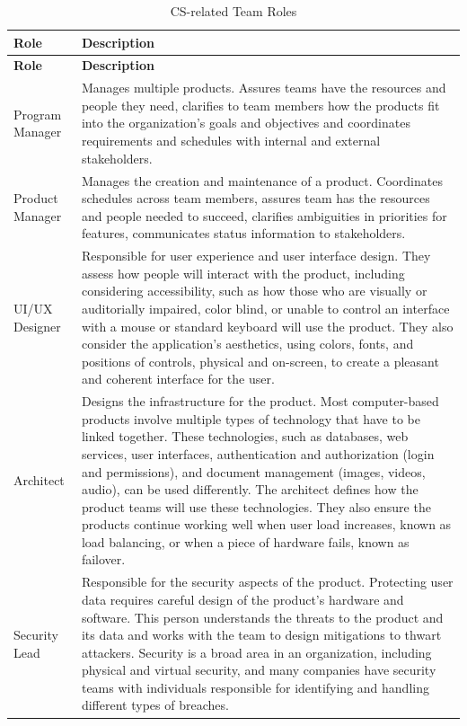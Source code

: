 \begin{longtable}[H]{p{.8in}|p{3.6in}}
	\caption{CS-related Team Roles}
	\label{tab:table2}\\
	\textbf{Role} & \textbf{Description}\\
	\hline
	\endfirsthead
	\textbf{Role} & \textbf{Description}\\
	\endhead
	\Tstrut Program Manager & Manages multiple products. Assures teams have the resources and people they need, clarifies to team members how the products fit into the organization's goals and objectives and coordinates requirements and schedules with internal and external stakeholders.\\
	\hline
	\Tstrut Product Manager & Manages the creation and maintenance of a product. Coordinates schedules across team members, assures team has the resources and people needed to succeed, clarifies ambiguities in priorities for features, communicates status information to stakeholders.\\
	\hline
	\Tstrut UI/UX \linebreak Designer & Responsible for user experience and user interface design. They assess how people will interact with the product, including considering accessibility, such as how those who are visually or auditorially impaired, color blind, or unable to control an interface with a mouse or standard keyboard will use the product. They also consider the application's aesthetics, using colors, fonts, and positions of controls, physical and on-screen, to create a pleasant and coherent interface for the user.\\
	\hline
	\Tstrut Architect & Designs the infrastructure for the product. Most computer-based products involve multiple types of technology that have to be linked together. These technologies, such as databases, web services, user interfaces, authentication and authorization (login and permissions), and document management (images, videos, audio), can be used differently. The architect defines how the product teams will use these technologies. They also ensure the products continue working well when user load increases, known as load balancing, or when a piece of hardware fails, known as failover.\\
	\hline
	\Tstrut Security Lead & Responsible for the security aspects of the product. Protecting user data requires careful design of the product's hardware and software. This person understands the threats to the product and its data and works with the team to design mitigations to thwart attackers. Security is a broad area in an organization, including physical and virtual security, and many companies have security teams with individuals responsible for identifying and handling different types of breaches.\\

\end{longtable}
